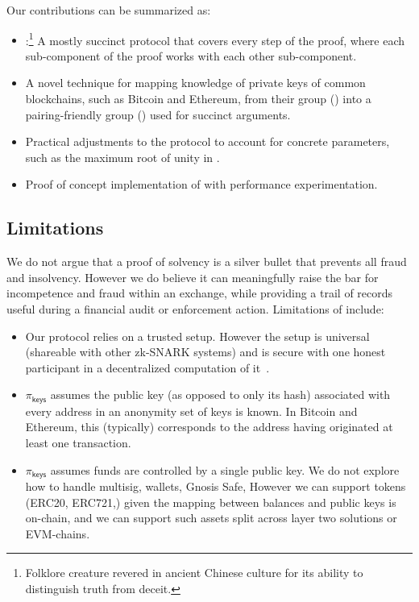 Our contributions can be summarized as:

\begin{itemize}
\item \Sys:\footnote{Folklore creature revered in ancient Chinese culture for its ability to distinguish truth from deceit.} A mostly succinct protocol that covers every step of the proof, where each sub-component of the proof works with each other sub-component.
\item A novel technique for mapping knowledge of private keys of common blockchains, such as Bitcoin and Ethereum, from their group (\secp) into a pairing-friendly group (\bls) used for succinct arguments.
\item Practical adjustments to the protocol to account for concrete parameters, such as the maximum root of unity in \bls. 
\item Proof of concept implementation of \Sys with performance experimentation.
\end{itemize}


\subsection{Limitations}

We do not argue that a proof of solvency is a silver bullet that prevents all fraud and insolvency. However we do believe it can meaningfully raise the bar for incompetence and fraud within an exchange, while providing a trail of records useful during a financial audit or enforcement action. Limitations of \Sys include: 

\begin{itemize}
\item Our protocol relies on a trusted setup. However the setup is universal (shareable with other zk-SNARK systems) and is secure with one honest participant in a decentralized computation of it~\cite{tau}.
\item $\pi_\mathsf{keys}$ assumes the public key (as opposed to only its hash) associated with every address in an anonymity set of keys is known. In Bitcoin and Ethereum, this (typically) corresponds to the address having originated at least one transaction. 
\item $\pi_\mathsf{keys}$ assumes funds are controlled by a single public key. We do not explore how to handle multisig, wallets, Gnosis Safe, \etc However we can support tokens (\eg ERC20, ERC721,\etc) given the mapping between balances and public keys is on-chain, and we can support such assets split across layer two solutions or EVM-chains. 
\end{itemize}

